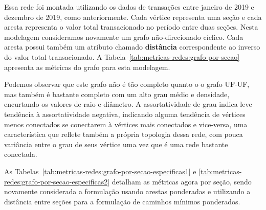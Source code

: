 Essa rede foi montada utilizando os dados de transações entre janeiro de 2019 e dezembro de 2019, como anteriormente. Cada vértice representa uma seção e cada aresta representa o valor total transacionado no período entre duas seções. Nesta modelagem consideramos novamente um grafo não-direcionado cíclico. Cada aresta possui também um atributo chamado \textbf{distância} correspondente ao inverso do valor total transacionado. A Tabela~\ref{tab:metricas-redes:grafo-por-secao} apresenta as métricas do grafo para esta modelagem.

Podemos observar que este grafo não é tão completo quanto o o grafo UF-UF, mas também é bastante completo com um alto grau médio e densidade, encurtando os valores de raio e diâmetro. A assortatividade de grau indica leve tendência à assortatividade negativa, indicando alguma tendência de vértices menos conectados se conectarem à vértices mais conectados e vice-versa, uma característica que reflete também a própria topologia dessa rede, com pouca variância entre o grau de seus vértice uma vez que é uma rede bastante conectada.

As Tabelas~\ref{tab:metricas-redes:grafo-por-secao-especificas1} e \ref{tab:metricas-redes:grafo-por-secao-especificas2} detalham as métricas agora por seção, sendo novamente considerada a formulação usando arestas ponderadas e utilizando a distância entre seções para a formulação de caminhos mínimos ponderados.

